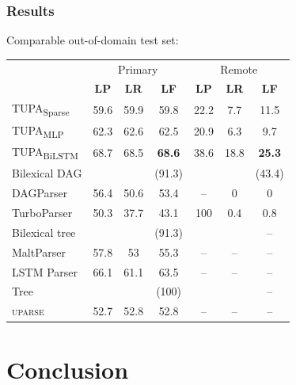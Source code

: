 \documentclass[t]{beamer}
\newcommand{\parser}[1]{TUPA\textsubscript{#1}}
\begin{document}
\begin{frame}
\frametitle{Results}
Comparable out-of-domain test set:
\begin{center}
	\begin{tabular}{l|ccc|ccc}
		& \multicolumn{3}{c|}{Primary} & \multicolumn{3}{c}{Remote} \\
		& \textbf{LP} & \textbf{LR} & \textbf{LF} & \textbf{LP} & \textbf{LR} & \textbf{LF} \\
		\hline
		\parser{Sparse}
		& 59.6 & 59.9 & 59.8 & 22.2 & 7.7 & 11.5 \\
		\parser{MLP}
		& 62.3 & 62.6 & 62.5 & 20.9 & 6.3 & 9.7 \\
		\parser{BiLSTM}
		& 68.7 & 68.5 & \textbf{68.6} & 38.6 & 18.8 & \textbf{25.3} \\
		\hline
		\footnotesize Bilexical DAG
		& & & \footnotesize (91.3) & & & \footnotesize (43.4) \\
		DAGParser
		& 56.4 & 50.6 & 53.4 & -- & 0 & 0 \\
		TurboParser
		& 50.3 & 37.7 & 43.1 & 100 & 0.4 & 0.8 \\
		\hline
		\footnotesize Bilexical tree
		& & & \footnotesize (91.3) & & & \footnotesize -- \\
		MaltParser
		& 57.8 & 53 & 55.3 & -- & -- & -- \\
		LSTM Parser
		& 66.1 & 61.1 & 63.5 & -- & -- & -- \\
		\hline
		\footnotesize Tree
		& & & \footnotesize (100) & & & \footnotesize -- \\
		\textsc{uparse}
		& 52.7 & 52.8 & 52.8 & -- & -- & --
	\end{tabular}
\end{center}
\end{frame}



\section{Conclusion}
\end{document}
